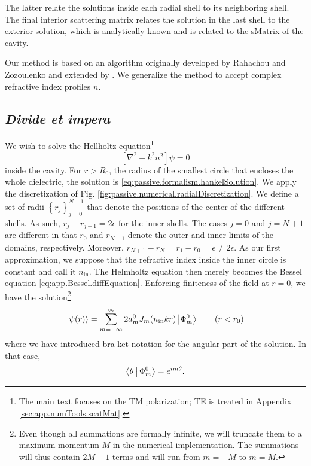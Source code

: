 The latter relate the solutions
inside each radial shell to its neighboring shell. The final
interior scattering matrix relates the solution in the last shell
to the exterior solution, which is analytically known and is 
related to the \gls{sMatrix} of the cavity.

Our method is based on an algorithm originally developed by 
Rahachou and Zozoulenko \cite{RAH2004} and extended by \cite{GAP2013a}. 
We generalize the method to accept complex refractive index
profiles $n$.

\subsection{\textit{Divide et impera}}
We wish to solve the Hellholtz equation\footnote{The main text focuses on the
TM polarization; TE is treated in Appendix \ref{sec:app.numTools.scatMat}.}
  \begin{equation}
   \left[\nabla^2+k^2n^2\right]\psi = 0
  \end{equation}
inside the cavity. For $r>R_0$, the radius of the smallest circle
that encloses the whole dielectric, the solution is 
\eqref{eq:passive.formalism.hankelSolution}. We apply the discretization
of Fig. \ref{fig:passive.numerical.radialDiscretization}. We define a set of 
radii $\left\{r_j\right\}_{j=0}^{N+1}$ that denote the positions of the center
of the different shells. As such, $r_j-r_{j-1}=2\epsilon$ for the inner shells.
The cases $j=0$ and $j=N+1$ are different in that $r_0$ and $r_{N+1}$ denote 
the outer and inner limits of the domains, respectively. Moreover, $r_{N+1}-r_N=r_1-r_0=\epsilon\neq2\epsilon$.
As our first approximation, we suppose that the refractive index
inside the inner circle is constant and call it $n_\text{in}$. The Helmholtz equation then merely
becomes the Bessel equation \eqref{eq:app.Bessel.diffEquation}. Enforcing
finiteness of the field at $r=0$, we have the solution\footnote{Even though all summations
are formally infinite, we will truncate them to a maximum momentum $M$ in the numerical
implementation. The summations will thus contain $2M+1$ terms and will run from $m=-M$ to 
$m=M$.}
  \begin{equation}
  	\label{eq:passive.formalism.innerCircleSoln}
   \Ket{\psi(r)} = \sum_{m=-\infty}^\infty2a_m^0J_m(n_\text{in}kr)\Ket{\Phi_m^0}	\qquad (r<r_0)
  \end{equation}
where we have introduced bra-ket notation for the angular part of the 
solution. In that case, 
  \begin{equation}
   \Braket{\theta|\Phi_m^0} = e^{im\theta}.
  \end{equation}
